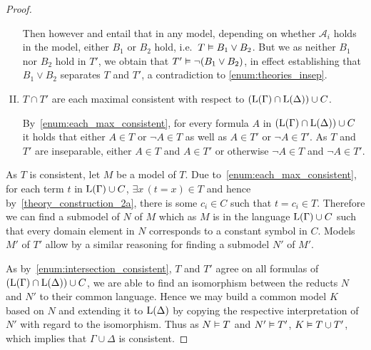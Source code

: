 \begin{proof}
\begin{enumerate}[I.]
			Then however \markA{} and \markB{} entail that in any model, depending on whether $\mathcal{A}_i$ holds in the model, either $B_1$ or $B_2$ hold, i.e.\ $T \vDash B_1 \lor B_2$.
			But we as neither $B_1$ nor $B_2$ hold in $T'$, we obtain that $T' \vDash \lnot (B_1 \lor B_2)$, in effect establishing that $B_1 \lor B_2$ separates $T$ and $T'$, a contradiction to \ref{enum:theories_insep}.


		\item
			\label{enum:intersection_consistent}
			$T \cap T'$ are each maximal consistent with respect to $(\operatorname{L}(\Gamma) \cap \operatorname{L}(\Delta)) \cup C$.

			By~\ref{enum:each_max_consistent}, for every formula $A$ in $(\operatorname{L}(\Gamma) \cap \operatorname{L}(\Delta)) \cup C$ it holds that either 
			$A \in T$ or $\lnot A \in T$ as well as
			$A \in T'$ or $\lnot A \in T'$. As $T$ and $T'$ are inseparable, either $A \in T$ and $A\in T'$ or otherwise $\lnot A \in T$ and $\lnot A \in T'$.

	\end{enumerate}


	As $T$ is consistent, let $M$ be a model of $T$.
	Due to~\ref{enum:each_max_consistent}, for each term $t$ in $\operatorname{L}(\Gamma)\cup C$, $\exists x\, (t = x) \in T$ and hence by~\ref{theory_construction_2a}, there is some $c_i \in C$ such that $t=c_i \in T$.
	Therefore we can find a submodel of $N$ of $M$ which as $M$ is in the language $\operatorname{L}(\Gamma)\cup C$ such that
	every domain element in $N$ corresponds to a constant symbol in $C$.
	Models $M'$ of $T'$ allow by a similar reasoning for finding a submodel $N'$ of $M'$.

	As by~\ref{enum:intersection_consistent}, $T$ and $T'$ agree on all formulas of $(\operatorname{L}(\Gamma) \cap \operatorname{L}(\Delta))\cup C$, 
	we are able to find an isomorphism between the reducts $N$ and $N'$ to their common language.
	Hence we may build a common model $K$ based on $N$ and extending it to $\operatorname{L}(\Delta)$ by copying the respective interpretation of $N'$ with regard to the isomorphism.
	Thus as $N\vDash T$ and $N'\vDash T'$, $K\vDash T \cup T'$, which implies that $\Gamma\cup\Delta$ is consistent.
\end{proof}

